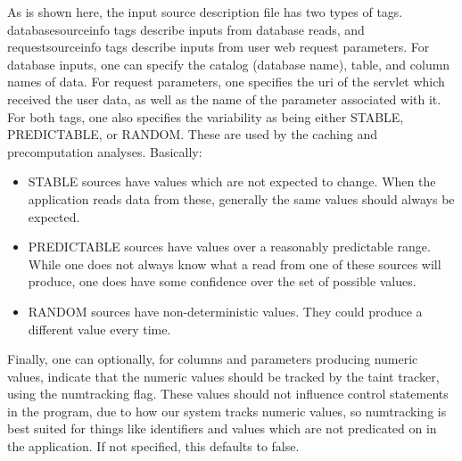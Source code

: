 \documentclass[msc,oneside]{ubcthesis}
\begin{document}
As is shown here, the input source description file has two types of tags. databasesourceinfo tags describe inputs from database reads, and requestsourceinfo tags describe inputs from user web request parameters. For database inputs, one can specify the catalog (database name), table, and column names of data. For request parameters, one specifies the uri of the servlet which received the user data, as well as the name of the parameter associated with it. \\

For both tags, one also specifies the variability as being either STABLE, PREDICTABLE, or RANDOM. These are used by the caching and precomputation analyses. Basically:
\begin{itemize}
\item STABLE sources have values which are not expected to change. When the application reads data from these, generally the same values should always be expected.
\item PREDICTABLE sources have values over a reasonably predictable range. While one does not always know what a read from one of these sources will produce, one does have some confidence over the set of possible values.
\item RANDOM sources have non-deterministic values. They could produce a different value every time.
\end{itemize}

Finally, one can optionally, for columns and parameters producing numeric values, indicate that the numeric values should be tracked by the taint tracker, using the numtracking flag. These values should not influence control statements in the program, due to how our system tracks numeric values, so numtracking is best suited for things like identifiers and values which are not predicated on in the application. If not specified, this defaults to false.
\end{document}

